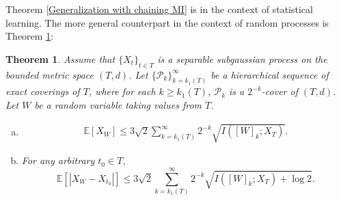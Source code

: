 \documentclass{article}
\newtheorem{theorem}{Theorem}
\newcommand{\E}{\mathbb{E}}
\begin{document}
Theorem \ref{Generalization with chaining MI} is in the context of statistical learning. The
more general counterpart in the context of random processes is Theorem \ref{Chaining MI Random Process}: 
\begin{theorem}\label{Chaining MI Random Process} Assume that $\{X_t\}_{t\in T}$ is a separable subgaussian process on the bounded metric space $(T,d)$. Let $\{\mathcal{P}_k\}_{k=k_1(T)}^{\infty}$ be a hierarchical sequence of exact coverings of $T$, where for each $k\geq k_1(T)$, $\mathcal{P}_k$ is a $ 2^{-k}$-cover of $(T,d)$. Let $W$ be a random variable taking values from $T$.
\begin{enumerate}[(a)]
\item
\begin{align}
\E[X_W]\leq 3\sqrt{2} \sum_{k=k_1(T)}^{\infty}2^{-k}\sqrt{I([W]_k;X_T)}.\nonumber
\end{align}
\item For any arbitrary $t_0\in T$,
\begin{equation}
\E[|X_W-X_{t_0}|]\leq 3\sqrt{2} \sum_{k=k_1(T)}^{\infty}2^{-k}\sqrt{I([W]_k;X_T)+\log 2}.\nonumber
\end{equation}
\end{enumerate}
\end{theorem}
\end{document}
